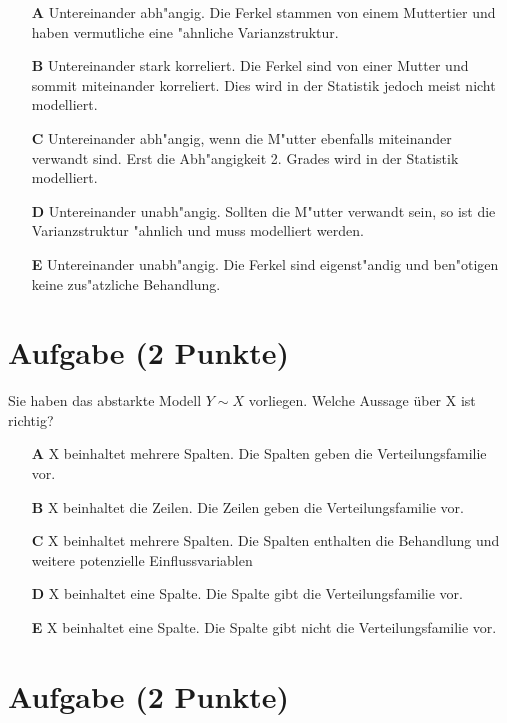 \documentclass[a4paper, 10pt]{scrartcl}\usepackage[]{graphicx}\usepackage[]{xcolor}
\begin{document}
\begin{enumerate}
\item [\textbf{A} \msquare] Untereinander abh{"a}ngig. Die Ferkel stammen von einem Muttertier und haben vermutliche eine {"a}hnliche Varianzstruktur.
\item [\textbf{B} \msquare] Untereinander stark korreliert. Die Ferkel sind von einer Mutter und sommit miteinander korreliert. Dies wird in der Statistik jedoch meist nicht modelliert.
\item [\textbf{C} \msquare] Untereinander abh{"a}ngig, wenn die M{"u}tter ebenfalls miteinander verwandt sind. Erst die Abh{"a}ngigkeit 2. Grades wird in der Statistik modelliert.
\item [\textbf{D} \msquare] Untereinander unabh{"a}ngig. Sollten die M{"u}tter verwandt sein, so ist die Varianzstruktur {"a}hnlich und muss modelliert werden.
\item [\textbf{E} \msquare] Untereinander unabh{"a}ngig. Die Ferkel sind eigenst{"a}ndig und ben{"o}tigen keine zus{"a}tzliche Behandlung.
\end{enumerate}

\section{Aufgabe \hfill (2 Punkte)}




Sie haben das abstarkte Modell $Y \sim X$ vorliegen. Welche Aussage {\"u}ber
X ist richtig?



\begin{enumerate}
\item [\textbf{A} \msquare] X beinhaltet mehrere Spalten. Die Spalten geben die Verteilungsfamilie vor.
\item [\textbf{B} \msquare] X beinhaltet die Zeilen. Die Zeilen geben die Verteilungsfamilie vor.
\item [\textbf{C} \msquare] X beinhaltet mehrere Spalten. Die Spalten enthalten die Behandlung und weitere potenzielle Einflussvariablen
\item [\textbf{D} \msquare] X beinhaltet eine Spalte. Die Spalte gibt die Verteilungsfamilie vor.
\item [\textbf{E} \msquare] X beinhaltet eine Spalte. Die Spalte gibt nicht die Verteilungsfamilie vor.
\end{enumerate}

\section{Aufgabe \hfill (2 Punkte)}
\end{document}
